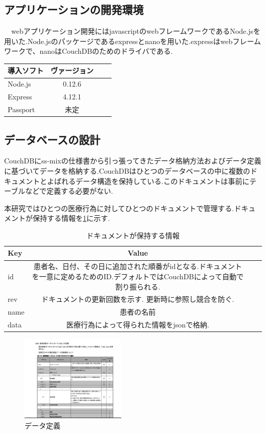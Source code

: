 \subsection{アプリケーションの開発環境}
　webアプリケーション開発にはjavascriptのwebフレームワークであるNode.jsを用いた.Node.jsのパッケージであるexpressとnanoを用いた.expressはwebフレームワークで、nanoはCouchDBのためのドライバである.

\begin{table}[htb]
	\begin{tabular}{|l|c|r|r|}\hline
	導入ソフト & ヴァージョン \\ \hline \hline
	Node.js & 0.12.6 \\ \hline
	Express & 4.12.1 \\ \hline
	Passport & 未定 \\ \hline
	\end{tabular}
\end{table}


\subsection{データベースの設計}
	CouchDBにss-mixの仕様書から引っ張ってきたデータ格納方法およびデータ定義\cite{bibi1}に基づいてデータを格納する.CouchDBはひとつのデータベースの中に複数のドキュメントとよばれるデータ構造を保持している.このドキュメントは事前にテーブルなどで定義する必要がない.

	本研究ではひとつの医療行為に対してひとつのドキュメントで管理する.ドキュメントが保持する情報を\ref{tab:doc}に示す.


\begin{table}[htb]
	\caption{ドキュメントが保持する情報}
	\begin{tabular}{|l|c|r|r|}\hline
	Key & Value \\ \hline \hline
	id &  患者名、日付、その日に追加された順番がidとなる.ドキュメントを一意に定めるためのID.デフォルトではCouchDBによって自動で割り振られる.\\ \hline
	rev & ドキュメントの更新回数を示す. 更新時に参照し競合を防ぐ. \\ \hline
	name & 患者の名前 \\ \hline
	data & 医療行為によって得られた情報をjsonで格納. \\ \hline
	\end{tabular}
	\label{tab:doc}
\end{table}



	\begin{figure}[htbp]
		\begin{center}
			\includegraphics[width=5cm, bb=0 0 645 790]{ss-mix_sample.png} %
		\end{center}
		\caption{データ定義}
		\label{ss-mix_sample}
	\end{figure}

